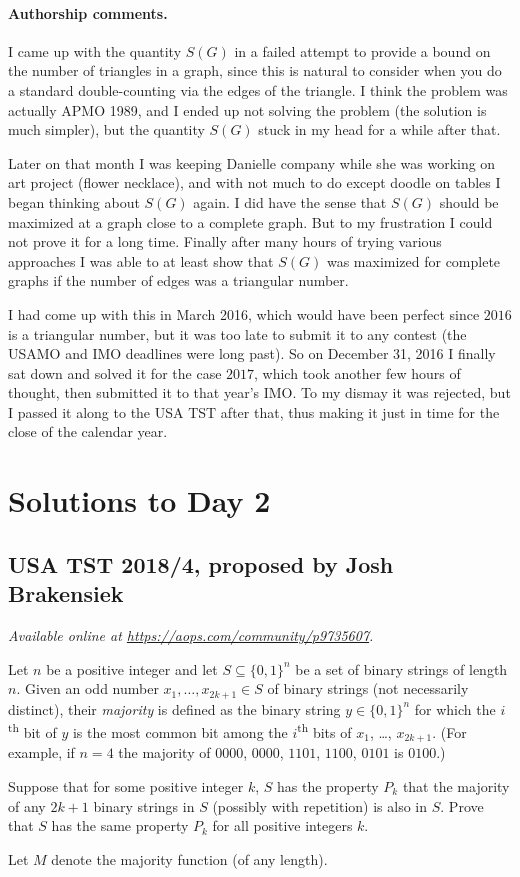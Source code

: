 \documentclass[11pt]{scrartcl}
\begin{document}
\paragraph{Authorship comments.}
I came up with the quantity $S(G)$
in a failed attempt to provide a bound on the number of triangles in a graph,
since this is natural to consider when you do a standard
double-counting via the edges of the triangle.
I think the problem was actually APMO 1989,
and I ended up not solving the problem (the solution is much simpler),
but the quantity $S(G)$ stuck in my head for a while after that.

Later on that month I was keeping Danielle company while
she was working on art project (flower necklace),
and with not much to do except doodle on tables
I began thinking about $S(G)$ again.
I did have the sense that $S(G)$ should be maximized
at a graph close to a complete graph.
But to my frustration I could not prove it for a long time.
Finally after many hours of trying various approaches
I was able to at least show that $S(G)$ was maximized
for complete graphs if the number of edges was a triangular number.

I had come up with this in March 2016,
which would have been perfect since $2016$ is a triangular number,
but it was too late to submit it to any contest
(the USAMO and IMO deadlines were long past).
So on December 31, 2016 I finally sat down and solved it for the case $2017$,
which took another few hours of thought, then submitted it to that year's IMO.
To my dismay it was rejected, but I passed it along to the USA TST after that,
thus making it just in time for the close of the calendar year.
\pagebreak

\section{Solutions to Day 2}
\subsection{USA TST 2018/4, proposed by Josh Brakensiek}
\textsl{Available online at \url{https://aops.com/community/p9735607}.}
\begin{mdframed}[style=mdpurplebox,frametitle={Problem statement}]
Let $n$ be a positive integer and let $S \subseteq \{0,1\}^n$
be a set of binary strings of length $n$.
Given an odd number $x_1, \dots, x_{2k+1} \in S$ of binary strings
(not necessarily distinct), their \emph{majority} is defined as
the binary string $y \in \{0,1\}^n$ for which
the $i$\textsuperscript{th} bit of $y$ is the most common bit
among the $i$\textsuperscript{th} bits of $x_1$, \dots, $x_{2k+1}$.
(For example, if $n=4$ the majority of
$0000$, $0000$, $1101$, $1100$, $0101$ is $0100$.)

Suppose that for some positive integer $k$,
$S$ has the property $P_k$ that the majority of any $2k+1$
binary strings in $S$ (possibly with repetition) is also in $S$.
Prove that $S$ has the same property $P_k$ for all
positive integers $k$.
\end{mdframed}
Let $M$ denote the majority function (of any length).
\end{document}
